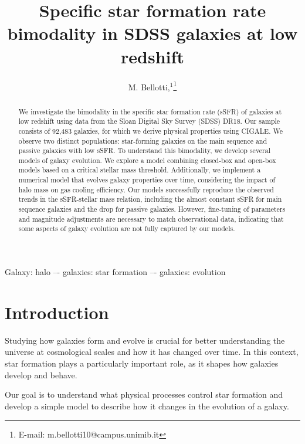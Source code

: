\documentclass[fleqn,usenatbib]{mnras}
\title{Specific star formation rate bimodality in SDSS galaxies at low redshift}
\author[M. Bellotti]{M. Bellotti,$^{1}$\thanks{E-mail: m.bellotti10@campus.unimib.it}
\\
\address{$^{1}$~\milan}}
\begin{document}
\label{firstpage}
\pagerange{\pageref{firstpage}--\pageref{lastpage}}
\maketitle

\begin{abstract}
We investigate the bimodality in the specific star formation rate (sSFR) of galaxies at low redshift using data from the Sloan Digital Sky Survey (SDSS) DR18. Our sample consists of 92,483 galaxies, for which we derive physical properties using CIGALE. We observe two distinct populations: star-forming galaxies on the main sequence and passive galaxies with low sSFR. To understand this bimodality, we develop several models of galaxy evolution. We explore a model combining closed-box and open-box models based on a critical stellar mass threshold. Additionally, we implement a numerical model that evolves galaxy properties over time, considering the impact of halo mass on gas cooling efficiency. Our models successfully reproduce the observed trends in the sSFR-stellar mass relation, including the almost constant sSFR for main sequence galaxies and the drop for passive galaxies. However, fine-tuning of parameters and magnitude adjustments are necessary to match observational data, indicating that some aspects of galaxy evolution are not fully captured by our models.
\end{abstract}

\begin{keywords}
Galaxy: halo –- galaxies: star formation –- galaxies: evolution 
\end{keywords}



\section{Introduction}
Studying how galaxies form and evolve is crucial for better understanding the universe at cosmological scales and how it has changed over time. In this context, star formation plays a particularly important role, as it shapes how galaxies develop and behave. 

Our goal is to understand what physical processes control star formation and develop a simple model to describe how it changes in the evolution of a galaxy.\\
\end{document}

